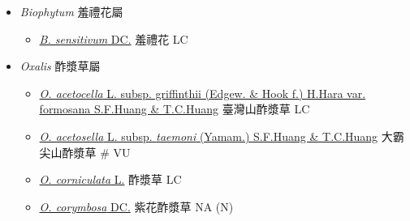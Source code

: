 
  \begin{itemize}
 \item[] \textit{Biophytum} 羞禮花屬
                                
  \begin{itemize}
        \item[] \href{http://www.theplantlist.org/tpl1.1/search?q=Biophytum+sensitivum}{\textit{B. sensitivum} DC.}   羞禮花   LC
  \end{itemize}
 \item[] \textit{Oxalis} 酢漿草屬
                                
  \begin{itemize}
        \item[] \href{http://www.theplantlist.org/tpl1.1/search?q=Oxalis+acetocella+subsp.+griffinthii+var.+formosana}{\textit{O. acetocella} L. subsp. griffinthii (Edgew. \& Hook f.) H.Hara var. formosana S.F.Huang \& T.C.Huang}   臺灣山酢漿草   LC
        \item[] \href{http://www.theplantlist.org/tpl1.1/search?q=Oxalis+acetosella+subsp.+taemoni}{\textit{O. acetosella} L. subsp. \textit{taemoni} (Yamam.) S.F.Huang \& T.C.Huang}   大霸尖山酢漿草  \# VU
        \item[] \href{http://www.theplantlist.org/tpl1.1/search?q=Oxalis+corniculata}{\textit{O. corniculata} L.}   酢漿草   LC
        \item[] \href{http://www.theplantlist.org/tpl1.1/search?q=Oxalis+corymbosa}{\textit{O. corymbosa} DC.}   紫花酢漿草   NA (N)
  \end{itemize}
  \end{itemize}
